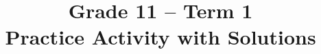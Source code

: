 \makeatletter
{}
\makeatother



\title{Grade 11 -- Term 1 \\ Practice Activity with Solutions}
\author{}
\date{}

\pagestyle{empty}


\newcommand{\SolvedGraph}[2]{%
	\par\smallskip
	\Needspace{4.6cm}%
	\begin{center}
		\textbf{\small #1}\par\vspace{-1mm}
		\resizebox{0.39\textwidth}{!}{%
			\begin{minipage}{10cm}
				#2
			\end{minipage}%
		}
	\end{center}
	\vspace{-2mm}%
}

\newcommand{\SolutionStage}[2]{%
	\Needspace{6\baselineskip}%
	\subsection{#2}%
}



